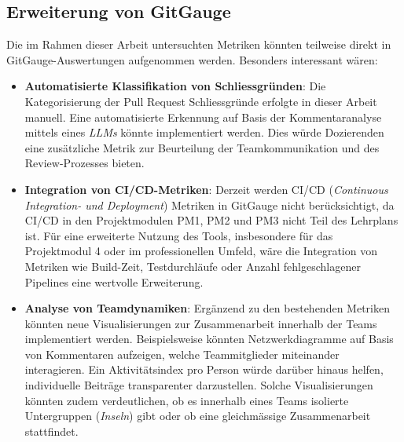 \subsection{Erweiterung von GitGauge}
Die im Rahmen dieser Arbeit untersuchten Metriken könnten teilweise direkt in GitGauge-Auswertungen aufgenommen werden. Besonders interessant wären:
\begin{itemize}
\item \textbf{Automatisierte Klassifikation von Schliessgründen}: Die Kategorisierung der Pull Request Schliessgründe erfolgte in dieser Arbeit manuell. Eine automatisierte Erkennung auf Basis der Kommentaranalyse mittels eines \textit{LLMs} könnte implementiert werden. Dies würde Dozierenden eine zusätzliche Metrik zur Beurteilung der Teamkommunikation und des Review-Prozesses bieten.
\item \textbf{Integration von CI/CD-Metriken}: Derzeit werden CI/CD (\textit{Continuous Integration- und Deployment}) Metriken in GitGauge nicht berücksichtigt, da CI/CD in den Projektmodulen PM1, PM2 und PM3 nicht Teil des Lehrplans ist. Für eine erweiterte Nutzung des Tools, insbesondere für das Projektmodul 4 oder im professionellen Umfeld, wäre die Integration von Metriken wie Build-Zeit, Testdurchläufe oder Anzahl fehlgeschlagener Pipelines eine wertvolle Erweiterung.
\item \textbf{Analyse von Teamdynamiken}: Ergänzend zu den bestehenden Metriken könnten neue Visualisierungen zur Zusammenarbeit innerhalb der Teams implementiert werden. Beispielsweise könnten Netzwerkdiagramme auf Basis von Kommentaren aufzeigen, welche Teammitglieder miteinander interagieren. Ein Aktivitätsindex pro Person würde darüber hinaus helfen, individuelle Beiträge transparenter darzustellen. Solche Visualisierungen könnten zudem verdeutlichen, ob es innerhalb eines Teams isolierte Untergruppen (\textit{Inseln}) gibt oder ob eine gleichmässige Zusammenarbeit stattfindet.
\end{itemize}

